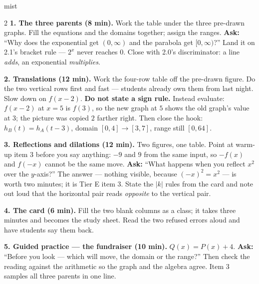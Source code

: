 \documentclass[10pt]{article}
\begin{document}
\boxguard
\begin{skillbox}[Lesson]{mist}
\begin{multicols}{2}
\textbf{1. The three parents (8 min).} Work the table under the three pre-drawn graphs. Fill the
equations and the domains together; assign the ranges. \textbf{Ask:} ``Why does the exponential get
$(0,\infty)$ and the parabola get $[0,\infty)$?'' Land it on 2.1's bracket rule --- $2^x$ never
reaches $0$. Close with 2.0's discriminator: a line \emph{adds}, an exponential \emph{multiplies}.

\textbf{2. Translations (12 min).} Work the four-row table off the pre-drawn figure. Do the two
vertical rows first and fast --- students already own them from last night. Slow down on
$f(x-2)$. \textbf{Do not state a sign rule.} Instead evaluate: $f(x-2)$ at $x=5$ is $f(3)$, so the
new graph at $5$ shows the old graph's value at $3$; the picture was copied $2$ farther right.
Then close the hook: $h_B(t)=h_A(t-3)$, domain $[0,4] \to [3,7]$, range still $[0,64]$.

\textbf{3. Reflections and dilations (12 min).} Two figures, one table. Point at warm-up item 3
before you say anything: $-9$ and $9$ from the same input, so $-f(x)$ and $f(-x)$ cannot be the
same move. \textbf{Ask:} ``What happens when you reflect $x^2$ over the $y$-axis?'' The answer
--- nothing visible, because $(-x)^2=x^2$ --- is worth two minutes; it is Tier E item 3. State the
$|k|$ rules from the card and note out loud that the horizontal pair reads \emph{opposite} to the
vertical pair.

\textbf{4. The card (6 min).} Fill the two blank columns as a class; it takes three minutes and
becomes the study sheet. Read the two refused errors aloud and have students say them back.

\textbf{5. Guided practice --- the fundraiser (10 min).} $Q(x)=P(x)+4$. \textbf{Ask:} ``Before you
look --- which will move, the domain or the range?'' Then check the reading against the arithmetic
so the graph and the algebra agree. Item 3 samples all three parents in one line.
\end{multicols}
\end{skillbox}
\end{document}
